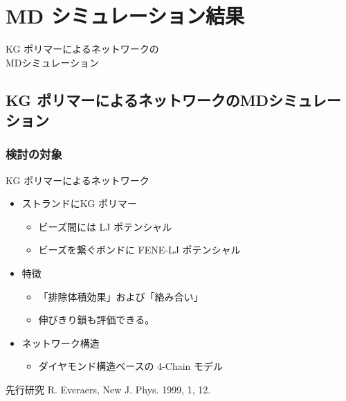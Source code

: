 \documentclass[11pt, dvipdfmx]{beamer}
\begin{document}
\section{MD シミュレーション結果}

\begin{frame}
\Large{KG ポリマーによるネットワークの\\MDシミュレーション}
\end{frame}
\subsection{KG ポリマーによるネットワークのMDシミュレーション}
\begin{frame}
\frametitle{検討の対象}

\begin{block}{KG ポリマーによるネットワーク}
	\begin{itemize}
	\item ストランドにKG ポリマー
		\begin{itemize}
		\item ビーズ間には LJ ポテンシャル
		\item ビーズを繋ぐボンドに FENE-LJ ポテンシャル
		\end{itemize}
	\item 特徴
		\begin{itemize}
		\item 「排除体積効果」および「絡み合い」
		\item 伸びきり鎖も評価できる。
		\end{itemize}
	\item ネットワーク構造
		\begin{itemize}
		\item ダイヤモンド構造ベースの 4-Chain モデル
		\end{itemize}
	\end{itemize}
\end{block}

\begin{alertblock}{先行研究}
R. Everaers, New J. Phys. 1999, 1, 12.
\end{alertblock}

\end{frame}
\end{document}
